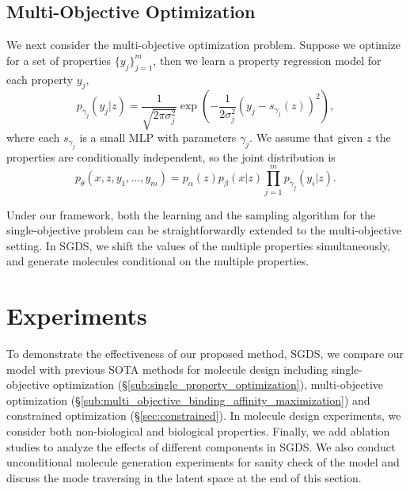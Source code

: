 \documentclass[accepted]{uai2023} %
\newcommand{\mysecref}[1]{\S\ref{#1}}
\begin{document}
\subsection{Multi-Objective Optimization}
\label{sec:moo}

We next consider the multi-objective optimization problem. Suppose we optimize for a set of properties $\{y_j\}_{j=1}^m$, then we learn a property regression model for each property $y_j$,
\begin{equation}
    p_{\gamma_j}(y_j | z) = \frac{1}{\sqrt{2 \pi \sigma_j^2}} \exp\left( - \frac{1}{2\sigma_j^2} (y_j - s_{\gamma_j}(z) )^2\right), 
\end{equation}
where each $s_{\gamma_j}$ is a small MLP with parameters $\gamma_j$.
We assume that given $z$ the properties are conditionally independent, so the joint distribution is
\begin{equation}
    p_\theta(x, z, y_1, ..., y_m) = p_\alpha(z) p_\beta(x | z) \prod_{j=1}^m p_{\gamma_j}(y_i | z).
\end{equation}

Under our framework, both the learning and the sampling algorithm for the single-objective problem can be straightforwardly extended to the multi-objective setting. In SGDS, we shift the values of the multiple properties simultaneously, and generate molecules conditional on the multiple properties. 

\section{Experiments}
To demonstrate the effectiveness of our proposed method, SGDS, we compare our model with previous SOTA methods for molecule design including single-objective optimization (\mysecref{sub:single_property_optimization}), multi-objective optimization (\mysecref{sub:multi_objective_binding_affinity_maximization}) and constrained optimization (\mysecref{sec:constrained}). In molecule design experiments, we consider both non-biological and biological properties. Finally, we add ablation studies to analyze the effects of different components in SGDS. We also conduct unconditional molecule generation experiments for sanity check of the model and discuss the mode traversing in the latent space at the end of this section.


\end{document}
